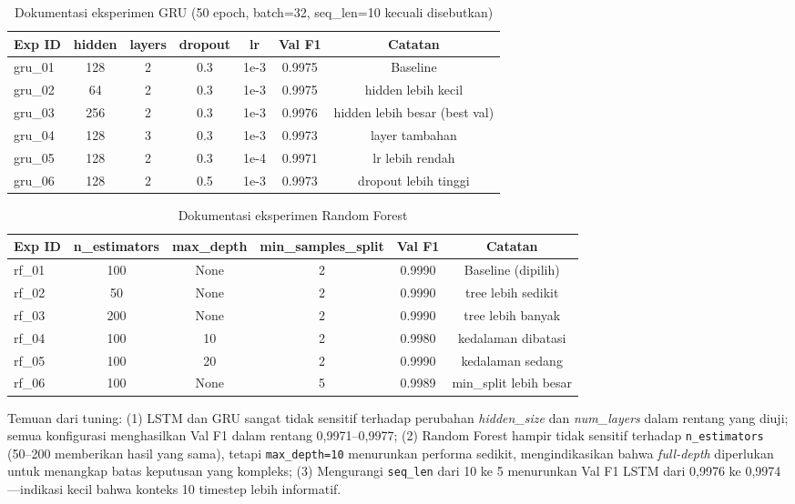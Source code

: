 \documentclass[11pt,a4paper,oneside]{report}
\begin{document}
\begin{table}[h!]
\centering
\caption{Dokumentasi eksperimen GRU (50 epoch, batch=32, seq\_len=10 kecuali disebutkan)}
\label{tab:gru-tuning}
\begin{tabular}{lcccccc}
\toprule
\textbf{Exp ID} & \textbf{hidden} & \textbf{layers} & \textbf{dropout} & \textbf{lr} & \textbf{Val F1} & \textbf{Catatan} \\
\midrule
gru\_01 & 128 & 2 & 0.3 & 1e-3 & 0.9975 & Baseline \\
gru\_02 & 64  & 2 & 0.3 & 1e-3 & 0.9975 & hidden lebih kecil \\
gru\_03 & 256 & 2 & 0.3 & 1e-3 & 0.9976 & hidden lebih besar (best val) \\
gru\_04 & 128 & 3 & 0.3 & 1e-3 & 0.9973 & layer tambahan \\
gru\_05 & 128 & 2 & 0.3 & 1e-4 & 0.9971 & lr lebih rendah \\
gru\_06 & 128 & 2 & 0.5 & 1e-3 & 0.9973 & dropout lebih tinggi \\
\bottomrule
\end{tabular}
\end{table}

\begin{table}[h!]
\centering
\caption{Dokumentasi eksperimen Random Forest}
\label{tab:rf-tuning}
\begin{tabular}{lccccc}
\toprule
\textbf{Exp ID} & \textbf{n\_estimators} & \textbf{max\_depth} & \textbf{min\_samples\_split} & \textbf{Val F1} & \textbf{Catatan} \\
\midrule
rf\_01 & 100 & None & 2 & 0.9990 & Baseline (dipilih) \\
rf\_02 & 50  & None & 2 & 0.9990 & tree lebih sedikit \\
rf\_03 & 200 & None & 2 & 0.9990 & tree lebih banyak \\
rf\_04 & 100 & 10   & 2 & 0.9980 & kedalaman dibatasi \\
rf\_05 & 100 & 20   & 2 & 0.9990 & kedalaman sedang \\
rf\_06 & 100 & None & 5 & 0.9989 & min\_split lebih besar \\
\bottomrule
\end{tabular}
\end{table}

Temuan dari tuning: (1) LSTM dan GRU sangat tidak sensitif terhadap perubahan \textit{hidden\_size} dan \textit{num\_layers} dalam rentang yang diuji; semua konfigurasi menghasilkan Val F1 dalam rentang 0,9971--0,9977; (2) Random Forest hampir tidak sensitif terhadap \texttt{n\_estimators} (50--200 memberikan hasil yang sama), tetapi \texttt{max\_depth=10} menurunkan performa sedikit, mengindikasikan bahwa \textit{full-depth} diperlukan untuk menangkap batas keputusan yang kompleks; (3) Mengurangi \texttt{seq\_len} dari 10 ke 5 menurunkan Val F1 LSTM dari 0,9976 ke 0,9974---indikasi kecil bahwa konteks 10 timestep lebih informatif.
\end{document}
